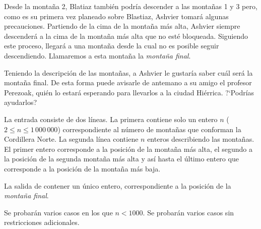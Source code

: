 \documentclass{oci}
\begin{document}
\begin{problemDescription}
Desde la montaña 2, Blatiaz también podría descender a las montañas 1 y 3 pero,
como es su primera vez planeado sobre Blastiaz, Ashvier tomará algunas precauciones.
Partiendo de la cima de la montaña más alta, Ashvier siempre descenderá a la cima de la montaña más
alta que no esté bloqueada.
Siguiendo este proceso, llegará a una montaña desde la cual no es posible seguir descendiendo.
Llamaremos a esta montaña la \emph{montaña final}.

Teniendo la descripción de las montañas, a Ashvier le gustaría saber cuál será la
montaña final.
De esta forma puede avisarle de antemano a su amigo el profesor Perezoak, quién lo estará
esperando para llevarlos a la ciudad Hiérrica.
?`Podrías ayudarlos?




\end{problemDescription}

\begin{inputDescription}

La entrada consiste de dos líneas.
La primera contiene solo un entero $n$ ($2 \leq n \leq 1\,000\,000$)
correspondiente al número de montañas que conforman la Cordillera Norte.
La segunda línea contiene $n$ enteros describiendo las montañas.
El primer entero corresponde a la posición de la montaña más alta, el segundo a la posición
de la segunda montaña más alta y así hasta el último entero que corresponde a la posición
de la montaña más baja.

\end{inputDescription}

\begin{outputDescription}
La salida de contener un único entero, correspondiente a la posición de la \emph{montaña final}.
\end{outputDescription}

\begin{scoreDescription}
  Se probarán varios casos en los que $n<1000$.
  Se probarán varios casos sin restricciones adicionales.
\end{scoreDescription}

\begin{sampleDescription}
\end{sampleDescription}
\end{document}
